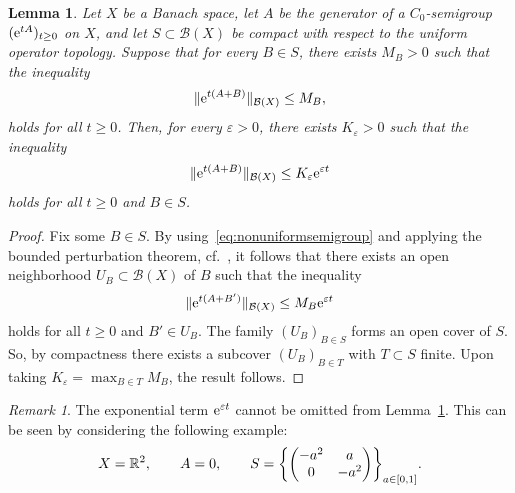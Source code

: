 \documentclass[12pt,oneside,a4paper,reqno]{amsart}
\numberwithin{equation}{section}
\newtheorem{lemma}[theorem]{Lemma}
\theoremstyle{definition}
\theoremstyle{remark}
\newtheorem{remark}[theorem]{Remark}
\newcommand{\bbR}{{\mathbb R}}
\newcommand{\eps}{\varepsilon}
\newcommand{\re}{{\rm e}}
\DeclarePairedDelimiter{\norm}{\lVert}{\rVert}
\DeclarePairedDelimiter{\cur}{\{}{\}}
\begin{document}
\begin{lemma}
    \label{lem:uniformsemigroup}
    Let $X$ be a Banach space, let $A$ be the generator of a $C_0$-semigroup $(\re^{tA})_{t \geq 0}$ on $X$, and let $S \subset \mathcal{B}(X)$ be compact with respect to the uniform operator topology.
    Suppose that for every $B \in S$, there exists $M_B > 0$ such that the inequality
    \begin{align}
        \label{eq:nonuniformsemigroup}
        \norm{\re^{t(A + B)}}_{\mathcal{B}(X)} \leq M_B,
    \end{align}
    holds for all $t \geq 0$.
    Then, for every $\eps > 0$, there exists $K_{\eps} > 0$ such that the inequality
    \begin{align*}
        \norm{\re^{t(A + B)}}_{\mathcal{B}(X)} \leq K_{\eps} \re^{\eps t}
    \end{align*}
    holds for all $t \geq 0$ and $B \in S$.
\end{lemma}
\begin{proof}
    Fix some $B \in S$.
    By using~\eqref{eq:nonuniformsemigroup} and applying the bounded perturbation theorem, cf.~\cite[Theorem III.1.3]{engel_oneparameter_2000}, it follows that there exists an open neighborhood $U_{B} \subset \mathcal{B}(X)$ of $B$ such that the inequality
    \begin{align}
        \norm{\re^{t(A + B')}}_{\mathcal{B}(X)} \leq M_B \re^{\eps t}
    \end{align}
    holds for all $t \geq 0$ and $B' \in U_{B}$.
    The family $(U_{B})_{B \in S}$ forms an open cover of $S$.
    So, by compactness there exists a subcover $(U_{B})_{B \in T}$ with $T \subset S$ finite.
    Upon taking $K_{\eps} = \max_{B \in T} M_B$, the result follows.
\end{proof}
\begin{remark}
    The exponential term $\re^{\eps t}$ cannot be omitted from Lemma~\ref{lem:uniformsemigroup}.
    This can be seen by considering the following example:
    \begin{equation*}
    X = \bbR^2,\qquad A = 0, \qquad
    S = \cur[\bigg]{\begin{pmatrix}
    -a^2 & a \\ 0 & -a^2
\end{pmatrix}}_{a \in [0,1]}.
\end{equation*}
\end{remark}

\printbibliography
\end{document}
